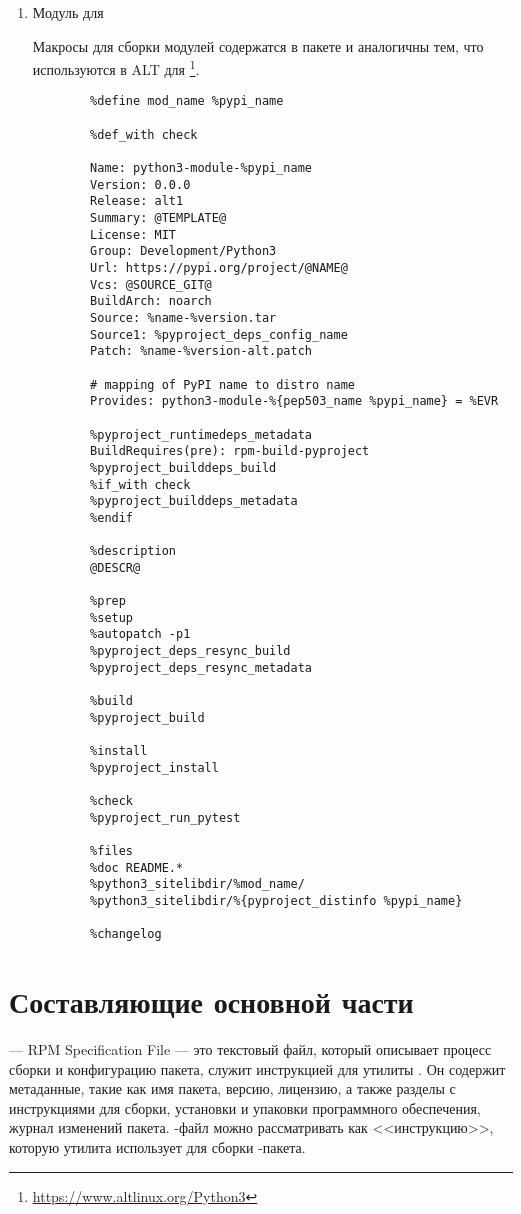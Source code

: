 \begin{enumerate}
	\item Модуль для 
	
	Макросы для сборки модулей  содержатся в пакете  и аналогичны тем, что используются в ALT для \footnote{\href{https://www.altlinux.org/Python3}{https://www.altlinux.org/Python3}}.
	\begin{Verbatim}[breaklines=true,breakanywhere=true,xleftmargin=-0.25\textwidth]
		%define pypi_name @NAME@
		%define mod_name %pypi_name
		
		%def_with check
		
		Name: python3-module-%pypi_name
		Version: 0.0.0
		Release: alt1
		Summary: @TEMPLATE@
		License: MIT
		Group: Development/Python3
		Url: https://pypi.org/project/@NAME@
		Vcs: @SOURCE_GIT@
		BuildArch: noarch
		Source: %name-%version.tar
		Source1: %pyproject_deps_config_name
		Patch: %name-%version-alt.patch
		
		# mapping of PyPI name to distro name
		Provides: python3-module-%{pep503_name %pypi_name} = %EVR
		
		%pyproject_runtimedeps_metadata
		BuildRequires(pre): rpm-build-pyproject
		%pyproject_builddeps_build
		%if_with check
		%pyproject_builddeps_metadata
		%endif
		
		%description
		@DESCR@
		
		%prep
		%setup
		%autopatch -p1
		%pyproject_deps_resync_build
		%pyproject_deps_resync_metadata
		
		%build
		%pyproject_build
		
		%install
		%pyproject_install
		
		%check
		%pyproject_run_pytest
		
		%files
		%doc README.*
		%python3_sitelibdir/%mod_name/
		%python3_sitelibdir/%{pyproject_distinfo %pypi_name}
		
		%changelog
	\end{Verbatim}
\end{enumerate}

\section{Составляющие основной части}
 --- RPM Specification File --- это текстовый файл, который описывает процесс сборки и конфигурацию пакета, служит инструкцией для утилиты . Он содержит метаданные, такие как имя пакета, версию, лицензию, а также разделы с инструкциями для сборки, установки и упаковки программного обеспечения, журнал изменений пакета. -файл можно рассматривать как <<инструкцию>>, которую утилита  использует для сборки -пакета. 

